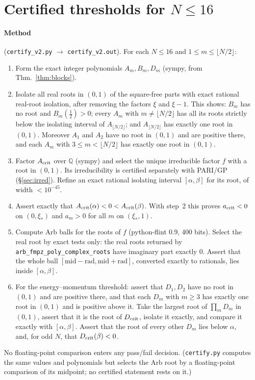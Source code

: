 \documentclass[11pt]{article}
\theoremstyle{remark}
\begin{document}
\section{Certified thresholds for $N\le16$}\label{sec:cert}
\paragraph{Method} (\texttt{certify\_v2.py} $\to$ \texttt{certify\_v2.out}). For each $N\le16$ and $1\le m\le\lfloor N/2\rfloor$:
\begin{enumerate}
\item Form the exact integer polynomials $A_m,B_m,D_m$ (sympy, from Thm.~\ref{thm:blocks}).
\item Isolate all real roots in $(0,1)$ of the square-free parts with exact rational real-root isolation, after removing
the factors $\xi$ and $\xi-1$. This shows: $B_m$ has no root and $B_m(\frac12)>0$; every $A_m$ with
$m\ne\lfloor N/2\rfloor$ has all its roots strictly below the isolating interval of $A_{\lfloor N/2\rfloor}$; and
$A_{\lfloor N/2\rfloor}$ has exactly one root in $(0,1)$. Moreover $A_1$ and $A_2$ have no root in $(0,1)$ and are positive
there, and each $A_m$ with $3\le m<\lfloor N/2\rfloor$ has exactly one root in $(0,1)$.
\item Factor $A_{\rm crit}$ over $\mathbb Q$ (sympy) and select the unique irreducible factor $f$ with a root in $(0,1)$.
Its irreducibility is certified separately with PARI/GP (\S\ref{sec:irred}). Refine an exact rational isolating interval $[\alpha,\beta]$ for its root, of width $<10^{-45}$.
\item Assert exactly that $A_{\rm crit}(\alpha)<0<A_{\rm crit}(\beta)$. With step~2 this proves $a_{\rm crit}<0$ on
$(0,\xi_*)$ and $a_m>0$ for all $m$ on $(\xi_*,1)$.
\item Compute Arb balls for the roots of $f$ (python-flint 0.9, 400 bits). Select the real root by exact tests only:
the real roots returned by \texttt{arb\_fmpz\_poly\_complex\_roots} have imaginary part exactly $0$. Assert that the
whole ball $[\mathrm{mid}-\mathrm{rad},\mathrm{mid}+\mathrm{rad}]$, converted exactly to rationals, lies inside $[\alpha,\beta]$.
\item For the energy--momentum threshold: assert that $D_1,D_2$ have no root in $(0,1)$ and are positive there, and that
each $D_m$ with $m\ge3$ has exactly one root in $(0,1)$ and is positive above it. Take the largest root of $\prod_mD_m$
in $(0,1)$, assert that it is the root of $D_{\rm crit}$, isolate it exactly, and compare it exactly with
$[\alpha,\beta]$. Assert that the root of every other $D_m$ lies below $\alpha$, and, for odd $N$, that
$D_{\rm crit}(\beta)<0$.
\end{enumerate}
No floating-point comparison enters any pass/fail decision. (\texttt{certify.py} computes the same values and
polynomials but selects the Arb root by a floating-point comparison of its midpoint; no certified statement rests on it.)
\end{document}
